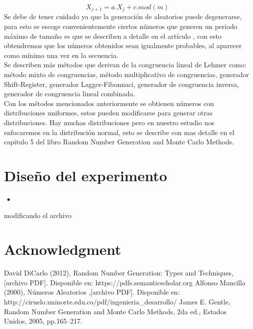 \documentclass[conference,a4paper]{IEEEtran}
\begin{document}
\begin{equation}
X_{j+1} = a.X_{j}+c.mod(m)
\end{equation}
Se debe de tener cuidado ya que la generaci\'on de aleatorios puede degenerarse, para esto se escoge convenientemente ciertos n\'umeros que generen un periodo m\'aximo de tama\~no $m$ que se describen a detalle en el art\'iculo \cite{b2}, con esto obtendremos que los n\'umeros obtenidos sean igualmente probables, al aparecer como m\'inimo una vez en la secuencia.\\
Se describen m\'as m\'etodos que derivan de la congruencia lineal de Lehmer como: m\'etodo mixto de congruencias, m\'etodo multiplicativo de congruencias, generador Shift-Register, generador Lagger-Fibonnaci, generador de congruencia inversa, generador de congruencia lineal combinada.\\
Con los m\'etodos mencionados anteriormente se obtienen n\'umeros con distribuciones uniformes, estos pueden modificarse para generar otras distribuciones. Hay muchas distribuciones pero en nuestro estudio nos enfocaremos en la distribuci\'on normal, esto se describe con mas detalle en el capitulo 5 del libro Random Number Generation and Monte Carlo Methods\cite{b3}. 
  
\section{\textbf{Dise\~no del experimento}}
\begin{itemize}

\item 
\end{itemize}

modificando el archivo

\section*{Acknowledgment}



\begin{thebibliography}{00}
 David DiCarlo (2012), Random Number Generation: Types and Techniques, [archivo PDF]. Disponible en: https://pdfs.semanticscholar.org
 Alfonso Mancilla (2000), N\'umeros Aleatorios ,[archivo PDF]. Disponible en: http://ciruelo.uninorte.edu.co/pdf/ingenieria\_desarrollo/
 James E. Gentle, Random Number Generation and Monte Carlo Methods, 2da ed., Estados Unidos, 2005, pp.165--217.

\end{thebibliography}
\vspace{12pt}
\end{document}
